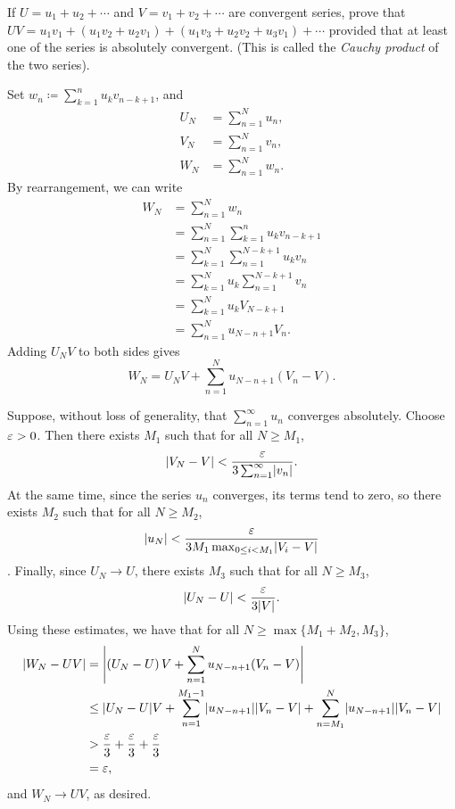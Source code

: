 \begin{exercise}
	If $U=u_1+u_2+\cdots$ and $V=v_1+v_2+\cdots$ are convergent series, prove that $UV=u_1v_1+(u_1v_2+u_2v_1)+(u_1v_3+u_2v_2+u_3v_1)+\cdots$ provided that at least one of the series is absolutely convergent. (This is called the \textit{Cauchy product} of the two series).
	
	\begin{sol}
		Set $w_n \coloneqq \sum_{k=1}^{n}u_kv_{n-k+1}$, and
		\begin{align*}
			U_N &=\sum_{n=1}^{N}u_n, \\
			V_N &=\sum_{n=1}^{N} v_n, \\
			W_N &=\sum_{n=1}^{N} w_n.
		\end{align*}
		By rearrangement, we can write
		\begin{align*}
			W_N &=\sum_{n=1}^{N}w_n \\
			&=\sum_{n=1}^{N}\sum_{k=1}^{n} u_kv_{n-k+1} \\
			&=\sum_{k=1}^{N}\sum_{n=1}^{N-k+1}u_kv_n \\
			&=\sum_{k=1}^{N}u_k\sum_{n=1}^{N-k+1}v_n \\
			&=\sum_{k=1}^{N}u_kV_{N-k+1} \\
			&=\sum_{n=1}^{N}u_{N-n+1}V_n.
		\end{align*}
		Adding $U_NV$ to both sides gives $$W_N=U_NV+\sum_{n=1}^{N}u_{N-n+1}\left(V_n-V\right).$$
		
		Suppose, without loss of generality, that $\sum_{n=1}^{\infty}u_n$ converges absolutely. Choose $\varepsilon>0$. Then there exists $M_1$ such that for all $N \ge M_1$, $$\lvert V_N-V \rvert< \dfrac{\varepsilon}{3\sum_{n=1}^{\infty}\lvert v_n \rvert}.$$ At the same time, since the series $u_n$ converges, its terms tend to zero, so there exists $M_2$ such that for all $N \ge M_2$, $$\lvert u_N \rvert<\dfrac{\varepsilon}{3M_1\max_{0 \le i<M_1}\lvert V_i-V \rvert}$$. Finally, since $U_N \rightarrow U$, there exists $M_3$ such that for all $N \ge M_3$, $$\lvert U_N-U \rvert<\dfrac{\varepsilon}{3\lvert V \rvert}.$$ Using these estimates, we have that for all $N \ge \max\{M_1+M_2,M_3\}$,
		\begin{align*}
			\lvert W_N-UV \rvert &=\left\lvert \left(U_N-U\right)V+\sum_{n=1}^{N}u_{N-n+1}(V_n-V)\right \rvert \\
			&\le \lvert U_N-U \rvert V+\sum_{n=1}^{M_1-1}\lvert u_{N-n+1} \rvert\lvert V_n-V \rvert+\sum_{n=M_1}^{N}\lvert u_{N-n+1} \rvert\lvert V_n-V \rvert \\
			&>\dfrac{\varepsilon}{3}+\dfrac{\varepsilon}{3}+\dfrac{\varepsilon}{3} \\
			&=\varepsilon,
		\end{align*}
		and $W_N \rightarrow UV$, as desired.
	\end{sol}
\end{exercise}

